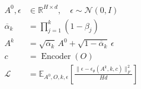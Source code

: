 \documentclass[border=7pt]{standalone}
\begin{document}
\color{ink}
$\displaystyle \begin{aligned}A^0,\epsilon&\in\mathbb R^{H\times d},\quad\epsilon\sim\mathcal N(0,I)\\ \overline\alpha_k&=\prod_{j=1}^{k}(1-\beta_j)\\ A^k&=\sqrt{\overline\alpha_k}\,A^0+\sqrt{1-\overline\alpha_k}\,\epsilon\\ c&=\operatorname{Encoder}(O)\\ \mathcal L&=\mathbb E_{A^0,O,k,\epsilon}\!\left[\frac{\|\epsilon-\epsilon_\theta(A^k,k,c)\|_F^2}{Hd}\right]\end{aligned}$
\end{document}

